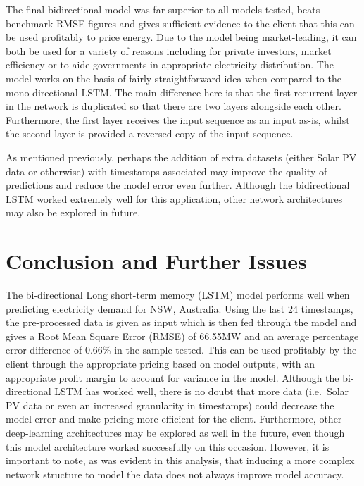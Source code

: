 \documentclass[mstat,12pt]{unswthesis}
\begin{document}
\bigskip

The final bidirectional model was far superior to all models tested,
beats benchmark RMSE figures and gives sufficient evidence to the client
that this can be used profitably to price energy. Due to the model being
market-leading, it can both be used for a variety of reasons including
for private investors, market efficiency or to aide governments in
appropriate electricity distribution. The model works on the basis of
fairly straightforward idea when compared to the mono-directional LSTM.
The main difference here is that the first recurrent layer in the
network is duplicated so that there are two layers alongside each other.
Furthermore, the first layer receives the input sequence as an input
as-is, whilst the second layer is provided a reversed copy of the input
sequence.

\bigskip

As mentioned previously, perhaps the addition of extra datasets (either
Solar PV data or otherwise) with timestamps associated may improve the
quality of predictions and reduce the model error even further. Although
the bidirectional LSTM worked extremely well for this application, other
network architectures may also be explored in future.

\hypertarget{conclusion-and-further-issues}{%
\chapter{Conclusion and Further
Issues}\label{conclusion-and-further-issues}}

The bi-directional Long short-term memory (LSTM) model performs well
when predicting electricity demand for NSW, Australia. Using the last 24
timestamps, the pre-processed data is given as input which is then fed
through the model and gives a Root Mean Square Error (RMSE) of 66.55MW
and an average percentage error difference of 0.66\% in the sample
tested. This can be used profitably by the client through the
appropriate pricing based on model outputs, with an appropriate profit
margin to account for variance in the model. Although the bi-directional
LSTM has worked well, there is no doubt that more data (i.e.~Solar PV
data or even an increased granularity in timestamps) could decrease the
model error and make pricing more efficient for the client. Furthermore,
other deep-learning architectures may be explored as well in the future,
even though this model architecture worked successfully on this
occasion. However, it is important to note, as was evident in this
analysis, that inducing a more complex network structure to model the
data does not always improve model accuracy.
\end{document}
